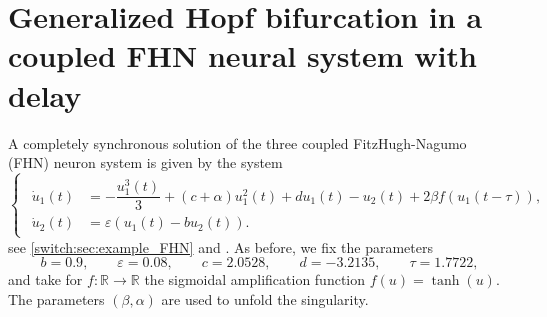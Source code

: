 \section{Generalized Hopf bifurcation in a coupled FHN neural system with delay}
A completely synchronous solution of the three coupled FitzHugh-Nagumo (FHN) neuron system is given by the system
\begin{equation}
\begin{cases}
\begin{aligned}
\dot{u}_{1}(t) & =-\dfrac{u_{1}^{3}(t)}{3}+(c+\alpha)u_{1}^{2}(t)+du_{1}(t)-u_{2}(t)+2\beta f(u_{1}(t-\tau)),\\
\dot{u}_{2}(t) & =\varepsilon(u_{1}(t)-bu_{2}(t)).
\end{aligned}
\end{cases}\label{switch:sm:eq:DDE_FHN}
\end{equation}
see \cref{switch:sec:example_FHN} and \cite{Ma2011}. As before, we fix the parameters
\[
b=0.9,\qquad\varepsilon=0.08,\qquad c=2.0528,\qquad d=-3.2135,\qquad\tau=1.7722,
\]
and take for $f:\mathbb{R}\to \mathbb{R}$ the sigmoidal amplification function $f(u)=\tanh(u)$. The parameters $(\beta,\alpha)$ are used to unfold the singularity. 

